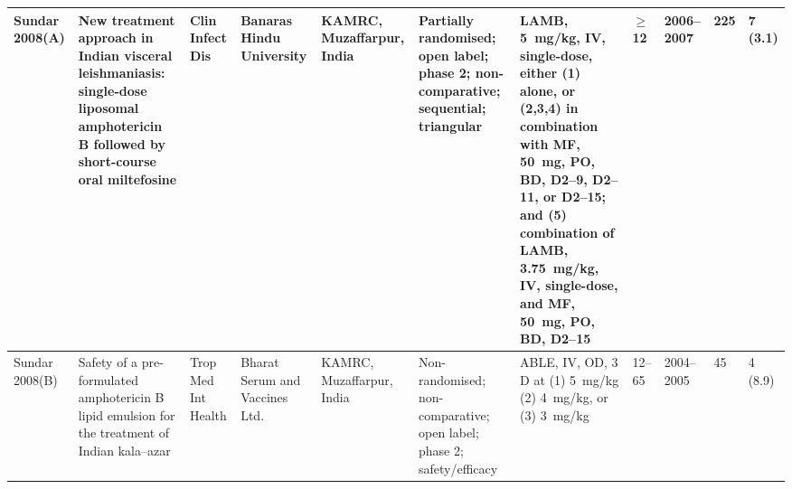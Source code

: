 \begin{ThreePartTable}
\begin{longtable}[c]{L{1.5cm} L{3.5cm} L{1.3cm} L{2.5cm} L{2.5cm} L{2.5cm} L{3cm} L{1.5cm} L{1cm} L{1cm} L{1.3cm}}
    Sundar 2008(A)\cite{sundar2008protC,sundar2008} & New treatment approach in Indian visceral leishmaniasis: single-dose liposomal amphotericin B followed by short-course oral miltefosine                                                                                     & Clin Infect Dis          & Banaras Hindu University                                                             & KAMRC, Muzaffarpur, India                         & Partially randomised; open label; phase 2; non-comparative; sequential; triangular & LAMB, 5~mg/kg, IV, single-dose, either (1) alone, or (2,3,4) in combination with MF, 50~mg, PO, BD, D2--9, D2--11, or D2--15; and (5) combination of LAMB, 3.75~mg/kg, IV, single-dose, and MF, 50~mg, PO, BD, D2--15 & $\geq$ 12   & 2006--2007   & 225          & 7 (3.1)                                                                                                                                                                                                                                                                                                                                                                                                                                                                                                                                                                                        \\ \midrule
    Sundar 2008(B)\cite{sundar2008B}                & Safety of a pre-formulated amphotericin B lipid emulsion for the treatment of Indian kala--azar                                                                                                                             & Trop Med Int Health      & Bharat Serum and Vaccines Ltd.                                                       & KAMRC, Muzaffarpur, India                         & Non-randomised; non-comparative; open label; phase 2; safety/efficacy              & ABLE, IV, OD, 3 D at (1) 5~mg/kg (2) 4~mg/kg, or (3) 3~mg/kg                                                                                                                                                          & 12--65      & 2004--2005   & 45           & 4 (8.9)                                                                                                                                                                                                                                                                                                                                                                                                                                                                                                                                                                                        \\ \midrule

\end{longtable}
\end{ThreePartTable}
